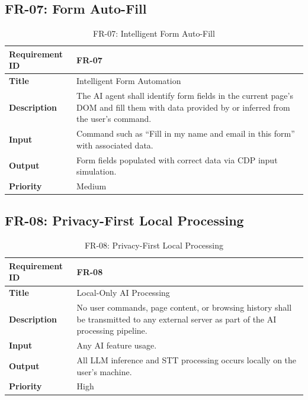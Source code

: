 \subsection{FR-07: Form Auto-Fill}
\begin{table}[H]
\centering
\caption{FR-07: Intelligent Form Auto-Fill}
\begin{tabular}{|p{4cm}|p{10cm}|}
\hline
\textbf{Requirement ID} & FR-07 \\ \hline
\textbf{Title} & Intelligent Form Automation \\ \hline
\textbf{Description} & The AI agent shall identify form fields in the current page's DOM and fill them with data provided by or inferred from the user's command. \\ \hline
\textbf{Input} & Command such as ``Fill in my name and email in this form'' with associated data. \\ \hline
\textbf{Output} & Form fields populated with correct data via CDP input simulation. \\ \hline
\textbf{Priority} & Medium \\ \hline
\end{tabular}
\end{table}

\needspace{7cm}
\subsection{FR-08: Privacy-First Local Processing}
\begin{table}[H]
\centering
\caption{FR-08: Privacy-First Local Processing}
\begin{tabular}{|p{4cm}|p{10cm}|}
\hline
\textbf{Requirement ID} & FR-08 \\ \hline
\textbf{Title} & Local-Only AI Processing \\ \hline
\textbf{Description} & No user commands, page content, or browsing history shall be transmitted to any external server as part of the AI processing pipeline. \\ \hline
\textbf{Input} & Any AI feature usage. \\ \hline
\textbf{Output} & All LLM inference and STT processing occurs locally on the user's machine. \\ \hline
\textbf{Priority} & High \\ \hline
\end{tabular}
\end{table}
